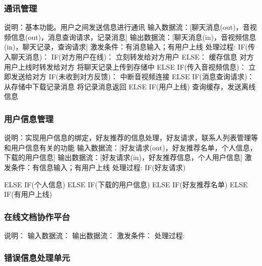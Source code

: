             \subsubsection{通讯管理}
                说明：基本功能。用户之间发送信息进行通讯
                输入数据流：[聊天消息(out)，音视频信息(out)，消息查询请求，记录消息]
                输出数据流：[聊天消息(in)，音视频信息(in)，聊天记录，查询请求]
                激发条件：有消息输入；有用户上线
                处理过程: 
                    IF(传入聊天消息)：
                        IF(对方用户在线)：
                            立刻转发给对方用户
                        ELSE：
                            缓存信息 对方用户上线时转发给对方
                        将聊天记录上传到存储中
                    ELSE IF(传入音视频信息)：
                        立即发送给对方
                        IF(未收到对方反馈)：
                            中断音视频连接
                    ELSE IF(消息查询请求)：
                        从存储中下载记录消息
                        将记录消息返回
                    ELSE IF(用户上线)
                        查询缓存，发送离线信息
            \subsubsection{用户信息管理}
                说明：实现用户信息的绑定，好友推荐的信息处理，好友请求，联系人列表管理等和用户信息有关的功能
                输入数据流：[好友请求(out)，好友推荐名单，个人信息，下载的用户信息]
                输出数据流：[好友请求(in)，好友推荐信息，个人用户信息]
                激发条件：有信息输入；有用户上线
                处理过程: 
                IF(好友请求)
                    
                ELSE IF(个人信息)
                ELSE IF(下载的用户信息)
                ELSE IF(好友推荐名单)
                ELSE IF(有用户上线)
            \subsubsection{在线文档协作平台}
                说明：
                输入数据流：
                输出数据流：
                激发条件：
                处理过程:   
            \subsubsection{错误信息处理单元}

